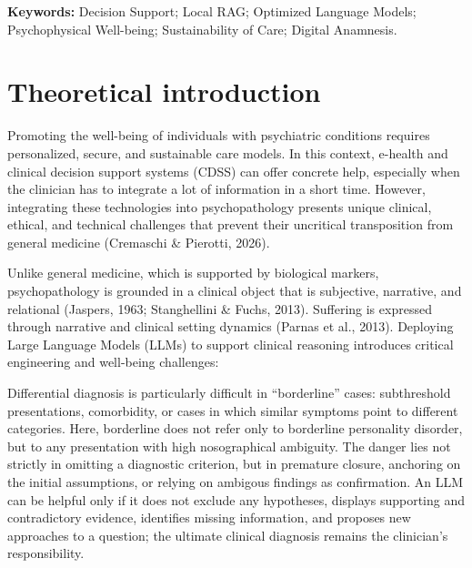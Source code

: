 \documentclass[11pt,a4paper]{article}
\begin{document}
\vspace{0.4cm}
\noindent \textbf{Keywords:} Decision Support; Local RAG; Optimized Language Models; Psychophysical Well-being; Sustainability of Care; Digital Anamnesis.

\newpage

\section{Theoretical introduction}

Promoting the well-being of individuals with psychiatric conditions requires personalized, secure, and sustainable care models. In this context, e-health and clinical decision support systems (CDSS) can offer concrete help, especially when the clinician has to integrate a lot of information in a short time. However, integrating these technologies into psychopathology presents unique clinical, ethical, and technical challenges that prevent their uncritical transposition from general medicine (Cremaschi \& Pierotti, 2026).

Unlike general medicine, which is supported by biological markers, psychopathology is grounded in a clinical object that is subjective, narrative, and relational (Jaspers, 1963; Stanghellini \& Fuchs, 2013). Suffering is expressed through narrative and clinical setting dynamics (Parnas et al., 2013). Deploying Large Language Models (LLMs) to support clinical reasoning introduces critical engineering and well-being challenges:

Differential diagnosis is particularly difficult in ``borderline'' cases: subthreshold presentations, comorbidity, or cases in which similar symptoms point to different categories. Here, borderline does not refer only to borderline personality disorder, but to any presentation with high nosographical ambiguity. The danger lies not strictly in omitting a diagnostic criterion, but in premature closure, anchoring on the initial assumptions, or relying on ambigous findings as confirmation. An LLM can be helpful only if it does not exclude any hypotheses, displays supporting and contradictory evidence, identifies missing information, and proposes new approaches to a question; the ultimate clinical diagnosis remains the clinician's responsibility.
\end{document}

